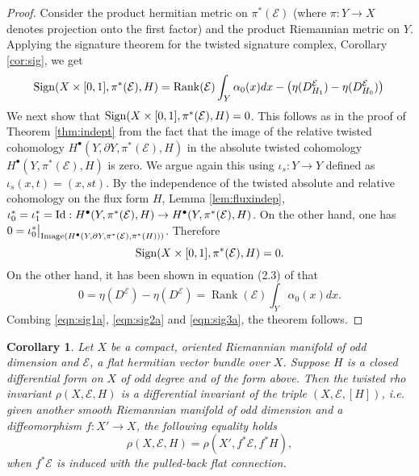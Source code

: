 \documentclass[12pt]{amsart}
\theoremstyle{plain}
\newtheorem{corollary}[theorem]{Corollary}
\theoremstyle{definition}
\theoremstyle{remark}
\begin{document}
{\begin{proof}
Consider the product hermitian metric on $\pi^*({\mathcal E})$ (where $\pi : Y \to X$
denotes projection onto the first factor) and the product Riemannian metric on $Y$. 
Applying the signature theorem for the twisted signature complex, Corollary \ref{cor:sig}, we get
\begin{equation}\label{eqn:sig1a}
{\rm Sign}(X \times [0,1], \pi^*({\mathcal E}), H)={\operatorname{Rank}}({\mathcal E}) \int_Y \alpha_0(x)dx - \left(\eta(D^{\mathcal E}_{H_1})
-\eta(D^{\mathcal E}_{H_0})\right)\\
\end{equation}
We next {{show}} that ${\rm Sign}(X \times [0,1], \pi^*({\mathcal E}), H)=0$. This follows as in the proof of Theorem \ref{thm:indept} from the fact that
the image of the relative twisted cohomology $H^\bullet(Y, \partial Y, \pi^*({\mathcal E}), H)$ in the
absolute  twisted cohomology $H^\bullet(Y,  \pi^*({\mathcal E}), H)$ is zero. We argue again this using $\iota_s : Y \to Y$  defined as $\iota_s(x, t) = (x, st)$. By the 
independence of the twisted absolute and relative cohomology on the flux form $H$, Lemma \ref{lem:fluxindep}, 
$\iota_0^* = \iota_1^*= {\rm Id} :  
H^\bullet(Y,  \pi^*({\mathcal E}), H) \to H^\bullet(Y,  \pi^*({\mathcal E}), H)$. On the other hand, one has
$0 = \iota_0^*\big|_{{\rm Image}(H^\bullet(Y, \partial Y, \pi^*({\mathcal E}), \pi^*(H)))}$. Therefore
\begin{equation}\label{eqn:sig2a}
{\rm Sign}(X \times [0,1], \pi^*({\mathcal E}), H)=0.
\end{equation}
On the other hand, it has been shown in equation (2.3) of \cite{APS2} that
\begin{equation}\label{eqn:sig3a}
0=\eta(D^{\mathcal E})
-\eta(D^{\mathcal E}) =  {\operatorname{Rank}}({\mathcal E})\int_Y \alpha_0(x)dx.
\end{equation}
Combing \eqref{eqn:sig1a}, \eqref{eqn:sig2a} and  \eqref{eqn:sig3a}, the theorem follows.
\end{proof}

\begin{corollary}
Let $X$ be a compact, oriented Riemannian manifold of odd dimension and ${\mathcal E}$,
a flat hermitian vector bundle over $X$.
Suppose $H$ is a closed differential form on $X$ of odd degree and of the form above.
Then the twisted rho invariant
$\rho(X,{\mathcal E},H)$ is a differential invariant of the triple $(X, {\mathcal E}, [H])$, {{i.e. given another smooth Riemannian manifold of odd dimension and a diffeomorphism $f:X'\to X$, the following equality holds
$$
\rho (X, {\mathcal E}, H) = \rho (X', f^*{\mathcal E}, f^*H),
$$
when $f^*{\mathcal E}$ is induced with the pulled-back flat connection.}}
\end{corollary}

}
\end{document}
